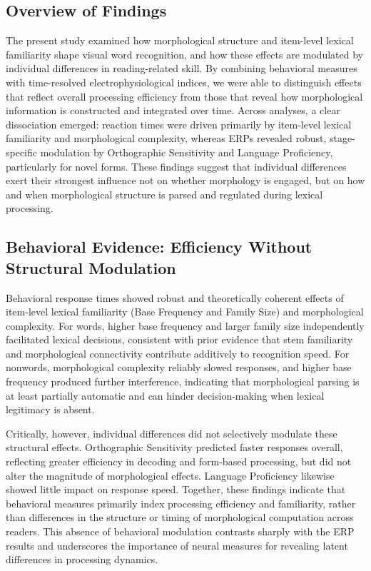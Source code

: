 \documentclass[preprint,12pt, authoryear, review]{elsarticle}
\begin{document}
\subsection{Overview of Findings}
The present study examined how morphological structure and item-level lexical familiarity shape visual word recognition, and how these effects are modulated by individual differences in reading-related skill. By combining behavioral measures with time-resolved electrophysiological indices, we were able to distinguish effects that reflect overall processing efficiency from those that reveal how morphological information is constructed and integrated over time. Across analyses, a clear dissociation emerged: reaction times were driven primarily by item-level lexical familiarity and morphological complexity, whereas ERPs revealed robust, stage-specific modulation by Orthographic Sensitivity and Language Proficiency, particularly for novel forms. These findings suggest that individual differences exert their strongest influence not on whether morphology is engaged, but on how and when morphological structure is parsed and regulated during lexical processing.

\subsection{Behavioral Evidence: Efficiency Without Structural Modulation}
Behavioral response times showed robust and theoretically coherent effects of item-level lexical familiarity (Base Frequency and Family Size) and morphological complexity. For words, higher base frequency and larger family size independently facilitated lexical decisions, consistent with prior evidence that stem familiarity and morphological connectivity contribute additively to recognition speed. For nonwords, morphological complexity reliably slowed responses, and higher base frequency produced further interference, indicating that morphological parsing is at least partially automatic and can hinder decision-making when lexical legitimacy is absent.

Critically, however, individual differences did not selectively modulate these structural effects. Orthographic Sensitivity predicted faster responses overall, reflecting greater efficiency in decoding and form-based processing, but did not alter the magnitude of morphological effects. Language Proficiency likewise showed little impact on response speed. Together, these findings indicate that behavioral measures primarily index processing efficiency and familiarity, rather than differences in the structure or timing of morphological computation across readers. This absence of behavioral modulation contrasts sharply with the ERP results and underscores the importance of neural measures for revealing latent differences in processing dynamics.
\end{document}
